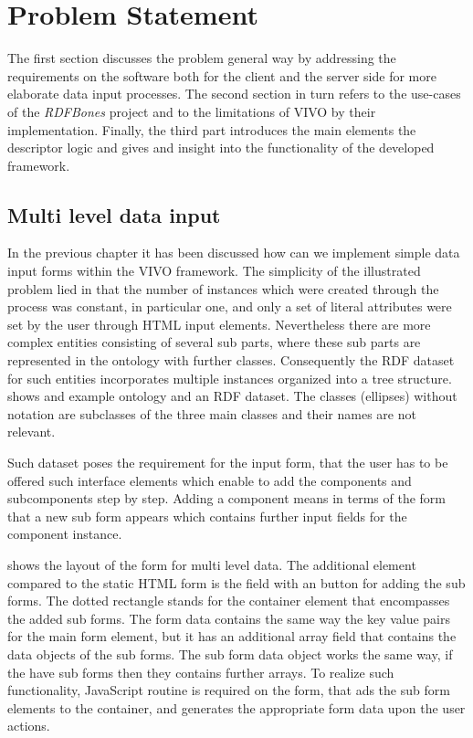 \chapter{Problem Statement}

The first section discusses the problem general way by addressing the requirements on the software both for the client and the server side for more elaborate data input processes. The second section in turn refers to the use-cases of the \textit{RDFBones} project and to the limitations of VIVO by their implementation. Finally, the third part introduces the main elements the descriptor logic and gives and insight into the functionality of the developed framework. 

\section{Multi level data input}

In the previous chapter it has been discussed how can we implement simple data input forms within the VIVO framework. The simplicity of the illustrated problem lied in that the number of instances which were created through the process was constant, in particular one, and only a set of literal attributes were set by the user through HTML input elements. Nevertheless there are more complex entities consisting of several sub parts, where these sub parts are represented in the ontology with further classes. Consequently the RDF dataset for such entities incorporates multiple instances organized into a tree structure.  shows and example ontology and an RDF dataset. The classes (ellipses) without notation are subclasses of the three main classes and their names are not relevant.


Such dataset poses the requirement for the input form, that the user has to be offered such interface elements which enable to add the components and subcomponents step by step. Adding a component means in terms of the form that a new sub form appears which contains further input fields for the component instance.


 shows the layout of the form for multi level data. The additional element compared to the static HTML form is the field with an button for adding the sub forms. The dotted rectangle stands for the container element that encompasses the added sub forms. The form data contains the same way the key value pairs for the main form element, but it has an additional array field that contains the data objects of the sub forms. The sub form data object works the same way, if the have sub forms then they contains further arrays. To realize such functionality, JavaScript routine is required on the form, that ads the sub form elements to the container, and generates the appropriate form data upon the user actions.

